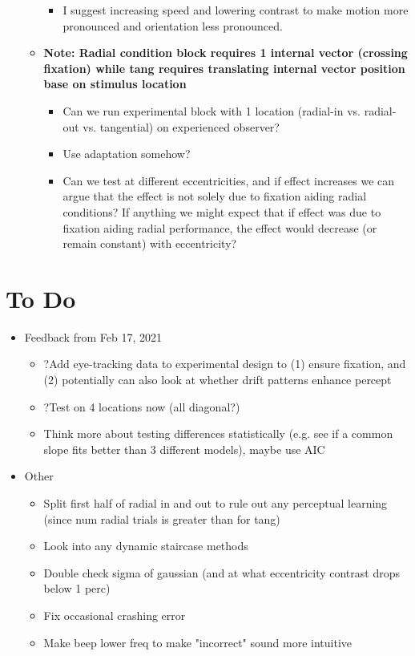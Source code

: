 \documentclass[11pt]{article} %
\begin{document}
\begin{itemize}
\begin{itemize}
		\begin{itemize}
			\item{I suggest increasing speed and lowering contrast to make motion more pronounced and orientation less pronounced.}
		\end{itemize}
	\item \textbf{Note: Radial condition block requires 1 internal vector (crossing fixation) while tang requires translating internal vector position base on stimulus location}
		\begin{itemize}
			\item{Can we run experimental block with 1 location (radial-in vs. radial-out vs. tangential) on experienced observer?}
			\item{Use adaptation somehow?}
			\item{Can we test at different eccentricities, and if effect increases we can argue that the effect is not solely due to fixation aiding radial conditions? If anything we might expect that if effect was due to fixation aiding radial performance, the effect would decrease (or remain constant) with eccentricity?}
		\end{itemize}
	\end{itemize}
\end{itemize}

\section{To Do} 
\begin{itemize}
\item Feedback from Feb 17, 2021
	\begin{itemize}
	\item ?Add eye-tracking data to experimental design to (1) ensure fixation, and (2) potentially can also look at whether drift patterns enhance percept
	\item ?Test on 4 locations now (all diagonal?)
	\item Think more about testing differences statistically (e.g. see if a common slope fits better than 3 different models), maybe use AIC
	\end{itemize}
\item Other
	\begin{itemize}
	\item Split first half of radial in and out to rule out any perceptual learning (since num radial trials is greater than for tang)
	\item Look into any dynamic staircase methods
	\item Double check sigma of gaussian (and at what eccentricity contrast drops below 1 perc)
	\item Fix occasional crashing error
	\item Make beep lower freq to make "incorrect" sound more intuitive
	\end{itemize}
\end{itemize}
\end{document}
